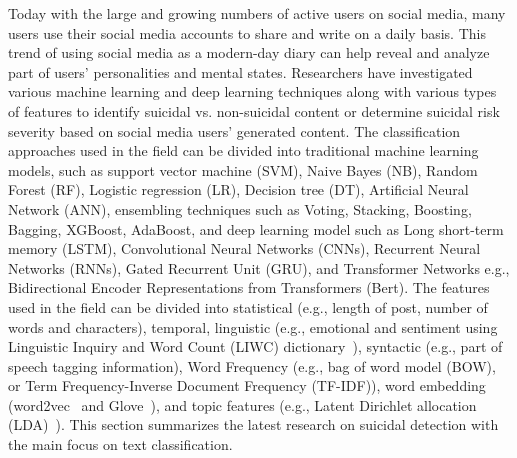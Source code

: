 \documentclass[sn-mathphys,Numbered]{sn-jnl}%
\begin{document}
Today with the large and growing numbers of active users on social media, many users use their social media accounts to share and write on a daily basis. This trend of using social media as a modern-day diary can help reveal and analyze part of users' personalities and mental states. Researchers have investigated various machine learning and deep learning techniques along with various types of features to identify suicidal vs. non-suicidal content or determine suicidal risk severity based on social media users' generated content. The classification approaches used in the field can be divided into traditional machine learning models, such as support vector machine (SVM), Naive Bayes (NB), Random Forest (RF), Logistic regression (LR), Decision tree (DT), Artificial Neural Network (ANN), ensembling techniques such as Voting, Stacking, Boosting, Bagging, XGBoost, AdaBoost, and deep learning model such as Long short-term memory (LSTM), Convolutional Neural Networks (CNNs), Recurrent Neural Networks (RNNs), Gated Recurrent Unit (GRU), and Transformer Networks e.g., Bidirectional Encoder Representations from Transformers (Bert). The features used in the field can be divided into statistical (e.g., length of post, number of words and characters), temporal, linguistic (e.g., emotional and sentiment using Linguistic Inquiry and Word Count (LIWC) dictionary~\cite{doi:10.1177/0261927X09351676}), syntactic (e.g., part of speech tagging information), Word Frequency (e.g., bag of word model (BOW), or  Term Frequency-Inverse Document Frequency (TF-IDF)), word embedding (word2vec~\cite{mikolov2013distributed} and Glove~\cite{pennington2014glove}), and topic features (e.g., Latent Dirichlet allocation (LDA)~\cite{blei2003latent}). This section summarizes the latest research on suicidal detection with the main focus on text classification. 
\end{document}
